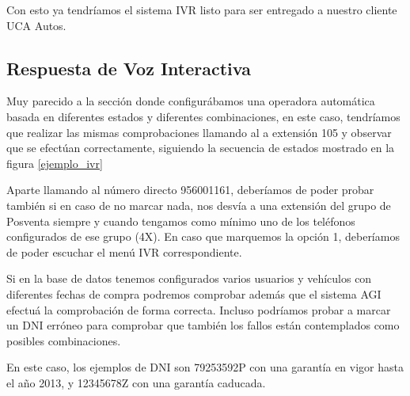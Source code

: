 Con esto ya tendríamos el sistema IVR listo para ser entregado a nuestro cliente UCA Autos.

\subsection{Respuesta de Voz Interactiva}

Muy parecido a la sección donde configurábamos una operadora automática basada en diferentes estados y diferentes combinaciones, en este caso, tendríamos que realizar las mismas comprobaciones llamando al a extensión 105 y observar que se efectúan correctamente, siguiendo la secuencia de estados mostrado en la figura \ref{ejemplo_ivr}

Aparte llamando al número directo 956001161, deberíamos de poder probar también si en caso de no marcar nada, nos desvía a una extensión del grupo de Posventa siempre y cuando tengamos como mínimo uno de los teléfonos configurados de ese grupo (4X). En caso que marquemos la opción 1, deberíamos de poder escuchar el menú IVR correspondiente.

Si en la base de datos tenemos configurados varios usuarios y vehículos con diferentes fechas de compra podremos comprobar además que el sistema AGI efectuá la comprobación de forma correcta. Incluso podríamos probar a marcar un DNI erróneo para comprobar que también los fallos están contemplados como posibles combinaciones.

En este caso, los ejemplos de DNI son 79253592P con una garantía en vigor hasta el año 2013, y 12345678Z con una garantía caducada.